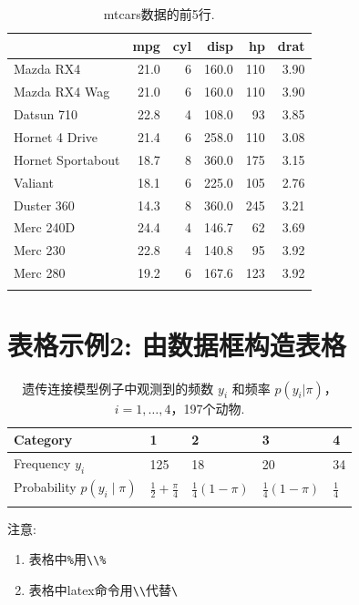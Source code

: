\documentclass[12pt,]{krantz}
\providecommand{\tightlist}{%
  \setlength{\itemsep}{0pt}\setlength{\parskip}{0pt}}
\theoremstyle{plain}
\theoremstyle{nonumberplain}
\begin{document}
\begin{table}

\caption{\label{tab:tab3-1}mtcars数据的前5行.}
\centering
\begin{tabular}[t]{lrrrrr}
\toprule{}
  & mpg & cyl & disp & hp & drat\\
\midrule{}
Mazda RX4 & 21.0 & 6 & 160.0 & 110 & 3.90\\
Mazda RX4 Wag & 21.0 & 6 & 160.0 & 110 & 3.90\\
Datsun 710 & 22.8 & 4 & 108.0 & 93 & 3.85\\
Hornet 4 Drive & 21.4 & 6 & 258.0 & 110 & 3.08\\
Hornet Sportabout & 18.7 & 8 & 360.0 & 175 & 3.15\\
\addlinespace
Valiant & 18.1 & 6 & 225.0 & 105 & 2.76\\
Duster 360 & 14.3 & 8 & 360.0 & 245 & 3.21\\
Merc 240D & 24.4 & 4 & 146.7 & 62 & 3.69\\
Merc 230 & 22.8 & 4 & 140.8 & 95 & 3.92\\
Merc 280 & 19.2 & 6 & 167.6 & 123 & 3.92\\
\bottomrule{}
\end{tabular}
\end{table}

\hypertarget{sec6-2}{%
\section{表格示例2: 由数据框构造表格}\label{sec6-2}}

\indent



\begin{table}

\caption{\label{tab:tab3-2}遗传连接模型例子中观测到的频数 \(y_i\) 和频率 \(p(y_i|\pi)\)，\(i=1, \dots ,4\)，197个动物.}
\centering
\begin{tabular}[t]{lllll}
\toprule{}
Category & 1 & 2 & 3 & 4\\
\midrule{}
Frequency $y_i$ & 125 & 18 & 20 & 34\\
Probability $p(y_i\mid\pi)$ & $\frac{1}{2}+\frac{\pi}{4}$ & $\frac{1}{4}(1-\pi)$ & $\frac{1}{4}(1-\pi)$ & $\frac{1}{4}$\\
\bottomrule{}
\end{tabular}
\end{table}

注意:

\begin{enumerate}
\def\labelenumi{\arabic{enumi}.}
\tightlist
\item
  表格中\texttt{\%}用\texttt{\textbackslash{}\textbackslash{}\%}
\item
  表格中latex命令用\texttt{\textbackslash{}\textbackslash{}}代替\texttt{\textbackslash{}}
\end{enumerate}
\end{document}
